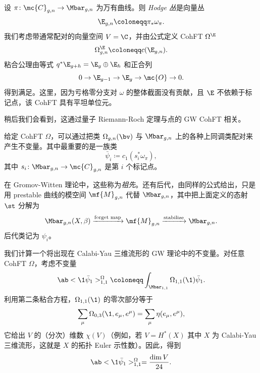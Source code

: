 \begin{exm}
    设 \(\pi \colon \mc{C}_{g,n} \to \Mbar_{g,n}\) 为万有曲线。则 \textit{Hodge 丛}是向量丛
    \[ \E_{g,n} \coloneqq \pi_* \omega_{\pi}. \]
    我们考虑带通常配对的向量空间 \(V = \C\)，并由公式定义 CohFT \(\Omega^{\E}\)
    \[ \Omega^{\E}_{g,n} \coloneqq c(\E_{g,n}). \]
    粘合公理由等式 \(q^* \E_{g+h} = \E_g \oplus \E_h\) 和正合列
    \[ 0 \to \E_{g-1} \to \E_g \to \mc{O} \to 0. \]
    得到满足。这里，因为亏格零分支对 \(\omega\) 的整体截面没有贡献，且 \(\E\) 不依赖于标记点，该 CohFT 具有平坦单位元。
\end{exm}

\begin{rmk}
    稍后我们会看到，这通过量子 Riemann-Roch 定理与点的 GW CohFT 相关。
\end{rmk}

给定 CohFT \(\Omega\)，可以通过把类 \(\Omega_{g,n}(\bv)\) 与 \(\Mbar_{g,n}\) 上的各种上同调类配对来产生不变量。其中最重要的是一族类
\[ \bar{\psi}_i \coloneqq c_1( s_i^* \omega_{\pi} ), \]
其中 \(s_i \colon \Mbar_{g,n} \to \mc{C}_{g,n}\) 是第 \(i\) 个标记点。

\begin{rmk}
    在 Gromov-Witten 理论中，这些称为\textit{祖先}。还有后代，由同样的公式给出，只是用 prestable 曲线的模空间 \(\mf{M}_{g,n}\) 代替 \(\Mbar_{g,n}\)，其中把上面定义的态射 \(\st\) 分解为
    \[ \Mbar_{g,n}(X,\beta) \xrightarrow{\text{forget map}} \mf{M}_{g,n} \xrightarrow{\text{stabilize}} \Mbar_{g,n}. \]
    后代类记为 \(\psi_i\)。
\end{rmk}

\begin{exm}
    我们计算一个将出现在 Calabi-Yau 三维流形的 GW 理论中的不变量。对任意 CohFT \(\Omega\)，考虑不变量
    \[ \ab<\1\bar{\psi}_1>_{1,1}^{\Omega}\coloneqq \int_{\Mbar_{1,1}} \Omega_{1,1}(\1)\bar{\psi}_1. \]
    利用第二条粘合方程，\(\Omega_{1,1}(\1)\) 的零次部分等于
    \[ \sum_{\mu} \Omega_{0,3}(\1, e_{\mu}, e^{\mu}) = \sum_{\mu} \eta(e_{\mu}, e^{\mu}), \]
    它给出 \(V\) 的（分次）维数 \(\chi(V)\)（例如，若 \(V = H^*(X)\) 其中 \(X\) 为 Calabi-Yau 三维流形，这就是 \(X\) 的拓扑 Euler 示性数）。因此，得到
    \[ \ab<\1\bar{\psi}_1>_{1,1}^{\Omega} = \frac{\dim V}{24}. \]
\end{exm}

